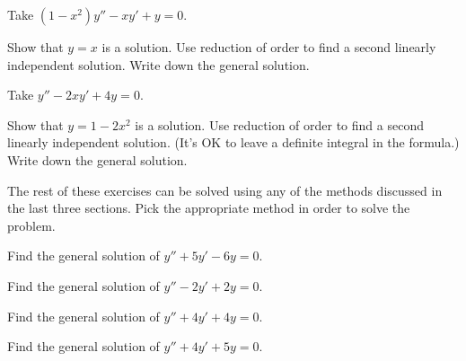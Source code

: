 \documentclass{ximera}
\begin{document}
\begin{exercise}
    Take $(1-x^2)y''-xy' + y = 0$.
    \begin{tasks}
        \task Show that $y=x$ is a solution.
        \task Use reduction of order to find a second linearly independent solution.
        \task Write down the general solution.
    \end{tasks}
\end{exercise}

\begin{exercise}
    Take $y''-2xy' + 4y = 0$.
    \begin{tasks}
        \task Show that $y=1-2x^2$ is a solution.  
        \task Use reduction of order to find a second linearly independent solution. (It's OK to leave a definite integral in the formula.)
        \task Write down the general solution.
    \end{tasks}
\end{exercise}

\noindent The rest of these exercises can be solved using any of the methods discussed in the last three sections. Pick the appropriate method in order to solve the problem.

\begin{exercise}
    Find the general solution of $y'' + 5y' - 6y = 0$.
\end{exercise}

\begin{exercise}
    Find the general solution of $y'' - 2y' + 2y = 0$.
\end{exercise}

\begin{exercise}
    Find the general solution of $y'' + 4y' + 4y = 0$.
\end{exercise}

\begin{exercise}
    Find the general solution of $y'' + 4y' + 5y = 0$.
\end{exercise}
\end{document}
